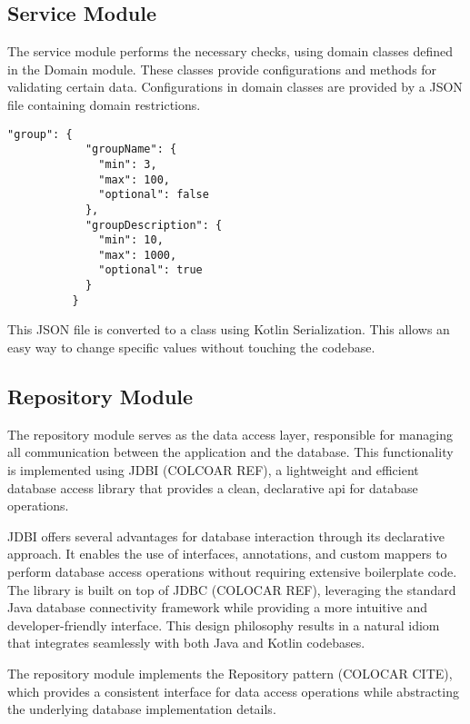 \subsection*{Service Module}
The service module performs the necessary checks, using domain classes defined in the Domain module. These classes provide configurations and methods for validating certain data. Configurations in domain classes are provided by a JSON file containing domain restrictions.

\begin{center}
    \begin{lstlisting}[caption={Example of the group entry}]
        "group": {
            "groupName": {
              "min": 3,
              "max": 100,
              "optional": false
            },
            "groupDescription": {
              "min": 10,
              "max": 1000,
              "optional": true
            }
          }
    \end{lstlisting}
\end{center}

This JSON file is converted to a class using Kotlin Serialization. This allows an easy way to change specific values without touching the codebase.

\subsection*{Repository Module}
The repository module serves as the data access layer, responsible for managing all communication between the application and the database. This functionality is implemented using JDBI (COLCOAR REF), a lightweight and efficient database access library that provides a clean, declarative \acs{api} for database operations.

JDBI offers several advantages for database interaction through its declarative approach. It enables the use of interfaces, annotations, and custom mappers to perform database access operations without requiring extensive boilerplate code. The library is built on top of JDBC (COLOCAR REF), leveraging the standard Java database connectivity framework while providing a more intuitive and developer-friendly interface. This design philosophy results in a natural idiom that integrates seamlessly with both Java and Kotlin codebases.

The repository module implements the Repository pattern (COLOCAR CITE), which provides a consistent interface for data access operations while abstracting the underlying database implementation details.

